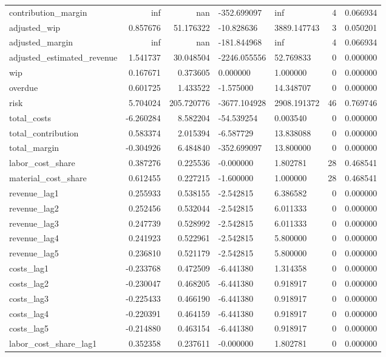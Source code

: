 \begin{landscape}
\begin{longtable}[h!]{lrrllrr}
contribution_margin & inf & nan & -352.699097 & inf & 4 & 0.066934 \\
adjusted_wip & 0.857676 & 51.176322 & -10.828636 & 3889.147743 & 3 & 0.050201 \\
adjusted_margin & inf & nan & -181.844968 & inf & 4 & 0.066934 \\
adjusted_estimated_revenue & 1.541737 & 30.048504 & -2246.055556 & 52.769833 & 0 & 0.000000 \\
wip & 0.167671 & 0.373605 & 0.000000 & 1.000000 & 0 & 0.000000 \\
overdue & 0.601725 & 1.433522 & -1.575000 & 14.348707 & 0 & 0.000000 \\
risk & 5.704024 & 205.720776 & -3677.104928 & 2908.191372 & 46 & 0.769746 \\
total_costs & -6.260284 & 8.582204 & -54.539254 & 0.003540 & 0 & 0.000000 \\
total_contribution & 0.583374 & 2.015394 & -6.587729 & 13.838088 & 0 & 0.000000 \\
total_margin & -0.304926 & 6.484840 & -352.699097 & 13.800000 & 0 & 0.000000 \\
labor_cost_share & 0.387276 & 0.225536 & -0.000000 & 1.802781 & 28 & 0.468541 \\
material_cost_share & 0.612455 & 0.227215 & -1.600000 & 1.000000 & 28 & 0.468541 \\
revenue_lag1 & 0.255933 & 0.538155 & -2.542815 & 6.386582 & 0 & 0.000000 \\
revenue_lag2 & 0.252456 & 0.532044 & -2.542815 & 6.011333 & 0 & 0.000000 \\
revenue_lag3 & 0.247739 & 0.528992 & -2.542815 & 6.011333 & 0 & 0.000000 \\
revenue_lag4 & 0.241923 & 0.522961 & -2.542815 & 5.800000 & 0 & 0.000000 \\
revenue_lag5 & 0.236810 & 0.521179 & -2.542815 & 5.800000 & 0 & 0.000000 \\
costs_lag1 & -0.233768 & 0.472509 & -6.441380 & 1.314358 & 0 & 0.000000 \\
costs_lag2 & -0.230047 & 0.468205 & -6.441380 & 0.918917 & 0 & 0.000000 \\
costs_lag3 & -0.225433 & 0.466190 & -6.441380 & 0.918917 & 0 & 0.000000 \\
costs_lag4 & -0.220391 & 0.464159 & -6.441380 & 0.918917 & 0 & 0.000000 \\
costs_lag5 & -0.214880 & 0.463154 & -6.441380 & 0.918917 & 0 & 0.000000 \\
labor_cost_share_lag1 & 0.352358 & 0.237611 & -0.000000 & 1.802781 & 0 & 0.000000 \\

\end{longtable}
\end{landscape}
